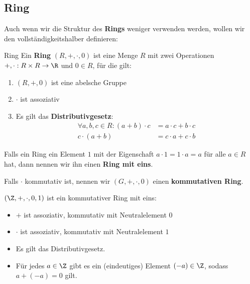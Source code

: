 \subsection{Ring}
Auch wenn wir die Struktur des \textbf{Rings} weniger verwenden werden, wollen wir den vollständigkeitshalber definieren:
\begin{definition}{Ring}{}
Ein \textbf{Ring} $(R, +, \cdot,0)$ ist eine Menge $R$ mit zwei Operationen $+,\cdot: R \times R \to \R$ und $0 \in R$, für die gilt:

\begin{enumerate}
    \item $(R, +, 0)$ ist eine abelsche Gruppe
    \item $\cdot$ ist assoziativ
    \item Es gilt das \textbf{Distributivgesetz}: 
    \begin{align*}
        \forall a,b,c \in R: (a + b) \cdot c &= a \cdot c + b \cdot c\\
                             c \cdot (a + b) &= c \cdot a + c \cdot b
    \end{align*}
\end{enumerate}
Falls ein Ring ein Element $1$ mit der Eigenschaft $a \cdot 1 = 1 \cdot a = a$ für alle $a \in R$ hat, dann nennen wir ihn einen \textbf{Ring mit eins}.

Falls  $\cdot$ kommutativ ist, nennen wir $(G, +, \cdot, 0)$ einen \textbf{kommutativen Ring}.
\end{definition}
\begin{example}[ ] $(\Z, +, \cdot, 0, 1)$ ist ein kommutativer Ring mit eins:
\begin{itemize}
    \item $+$ ist assoziativ, kommutativ mit Neutralelement $0$
    \item $\cdot$ ist assoziativ, kommutativ mit Neutralelement $1$
    \item Es gilt das Distributivgesetz.
    \item Für jedes $a \in \Z$ gibt es ein (eindeutiges) Element $(-a) \in \Z$, sodass $a + (-a) = 0$ gilt.
\end{itemize}
\end{example}

